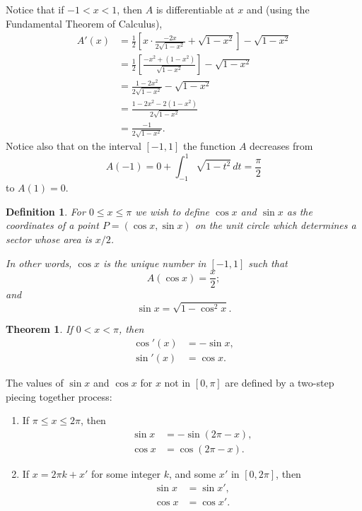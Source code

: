 \documentclass{article}
\numberwithin{corollary}{subsection}
\newtheorem{definition}{Definition}
\numberwithin{definition}{subsection}
\numberwithin{lemma}{subsection}
\newtheorem{theorem}{Theorem}
\numberwithin{theorem}{subsection}
\begin{document}
Notice that if $-1 < x < 1$, then $A$ is differentiable at $x$ and (using the
Fundamental Theorem of Calculus),
\begin{align*}
  A'(x)
  &= \frac{1}{2}\left[
    x \cdot \frac{-2x}{2\sqrt{1 - x^2}}
    + \sqrt{1 - x^2}
  \right] - \sqrt{1 - x^2} \\
  &= \frac{1}{2}\left[ \frac{-x^2 + (1 - x^2)}{\sqrt{1 - x^2}} \right] -
  \sqrt{1 - x^2} \\
  &= \frac{1 - 2x^2}{2\sqrt{1 - x^2}} - \sqrt{1 - x^2} \\
  &= \frac{1 - 2x^2 - 2(1 - x^2)}{2\sqrt{1 - x^2}} \\
  &= \frac{-1}{2\sqrt{1 - x^2}}.
\end{align*} Notice also that on the interval $[-1, 1]$ the function $A$
decreases from \[
  A(-1) = 0 + \int_{-1}^1 \sqrt{1 - t^2} \,dt = \frac{\pi}{2}
\] to $A(1) = 0$.

\begin{definition}
  For $0 \leq x \leq \pi$ we wish to define $\cos x$ and $\sin x$ as the
  coordinates of a point $P = (\cos x, \sin x)$ on the unit circle which
  determines a sector whose area is $x/2$.

  In other words, $\cos x$ is the unique number in $[-1, 1]$ such that
  \[
    A(\cos x) = \frac{x}{2};
  \] and \[
    \sin x = \sqrt{1 - \cos^2 x}.
  \]
\end{definition}

\begin{theorem}
  If $0 < x < \pi$, then
  \begin{align*}
    \cos'(x) &= -\sin x, \\
    \sin'(x) &= \cos x.
  \end{align*}
\end{theorem}

The values of $\sin x$ and $\cos x$ for $x$ not in $[0, \pi]$ are defined by a
two-step piecing together process:
\begin{enumerate}
  \item If $\pi \leq x \leq 2\pi$, then
    \begin{align*}
      \sin x &= -\sin(2\pi - x), \\
      \cos x &= \cos(2\pi - x).
    \end{align*}
  \item If $x = 2\pi k + x'$ for some integer $k$, and some $x'$ in $[0,
    2\pi]$, then
    \begin{align*}
      \sin x &= \sin x', \\
      \cos x &= \cos x'.
    \end{align*}
\end{enumerate}
\end{document}
